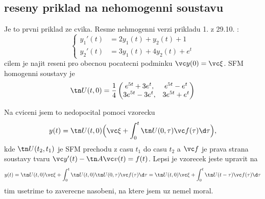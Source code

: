 \subsection{reseny priklad na nehomogenni soustavu}
Je to prvni priklad ze cvika. Resme nehmogenni verzi prikladu 1. z 29.10. :
\[
  \left\{\begin{aligned}
      y_1'(t)&=2y_1(t)+y_2(t)+1\\
      y_2'(t)&=3y_1(t)+4y_2(t)+e^t
         \end{aligned}\right.
\]
cilem je najit reseni pro obecnou pocatecni podminku $\vc y(0)=\vc \xi$.
SFM homogenni soustavy je
\[
\tn U(t,0)=\frac14\begin{pmatrix}
                     e^{5t}+3e^t,&e^{5t}-e^t\\
                     3e^{5t}-3e^t,&3e^{5t}+e^t
                     \end{pmatrix}
\]

Na cviceni jsem to nedopocital pomoci vzorecku
\[
  y(t)=\tn U(t,0)\Big(\vc\xi+\int_0^t \tn U(0,\tau)\vc f(\tau)\d\tau\Big),
\]
kde $\tn U(t_2,t_1)$ je SFM prechodu z casu $t_1$ do casu $t_2$ a $\vc f$ je prava strana soustavy tvaru 
$\vc y'(t)-\tn A\vc v(t)=f(t)$.
Lepsi je vzorecek jeste upravit na
\[
  y(t)=\tn U(t,0)\vc\xi+\int_0^t \tn U(t,0)\tn U(0,\tau) \vc f(\tau)\d\tau=
  \tn U(t,0)\vc\xi+\int_0^t \tn U(t-\tau) \vc f(\tau)\d\tau
\]
tim usetrime to zaverecne nasobeni, na ktere jsem uz nemel moral.

